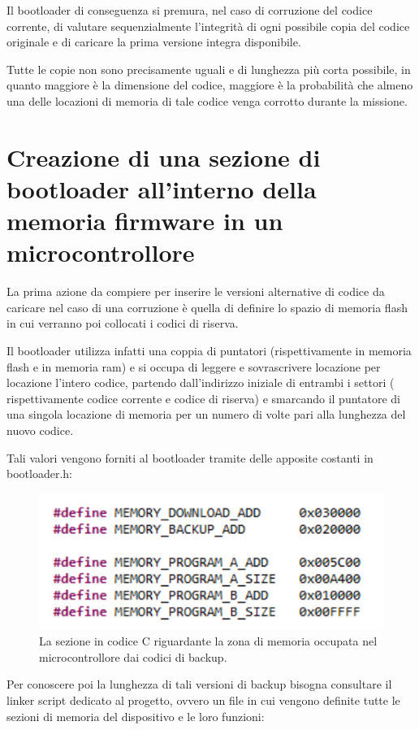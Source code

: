 \documentclass[LaM,binding=0.6cm]{../sapthesis}
\begin{document}
Il bootloader di conseguenza si premura, nel caso di corruzione del codice corrente, di valutare sequenzialmente l'integrità di ogni possibile copia del codice originale e di caricare la prima versione integra disponibile.

Tutte le copie non sono precisamente uguali e di lunghezza più corta possibile, in quanto maggiore è la dimensione del codice, maggiore è la probabilità che almeno una delle locazioni di memoria di tale codice venga corrotto durante la missione.



\section{Creazione di una sezione di bootloader all'interno della memoria firmware in un microcontrollore}

La prima azione da compiere per inserire le versioni alternative di codice da caricare nel caso di una corruzione è quella di definire lo spazio di memoria flash in cui verranno poi collocati i codici di riserva.

Il bootloader utilizza  infatti una coppia di puntatori (rispettivamente in memoria flash e in memoria ram) e si occupa di leggere e sovrascrivere locazione per locazione l'intero codice,
partendo dall'indirizzo iniziale di entrambi i settori ( rispettivamente codice corrente e codice di riserva) e smarcando il puntatore di una singola locazione di memoria per un numero di volte pari alla lunghezza del nuovo codice.\newline

Tali valori vengono forniti al bootloader tramite delle apposite costanti in bootloader.h:

\begin{figure}[htbp]
\centerline{\includegraphics[scale=.7]{examples/BackupSection.PNG}}
\caption{La sezione in codice C riguardante la zona di memoria occupata nel microcontrollore dai codici di backup.}
\label{fig}
\end{figure}
\newpage
Per conoscere poi la lunghezza di tali versioni di backup bisogna consultare il linker script dedicato al progetto, ovvero un file in cui vengono definite tutte le sezioni di memoria del dispositivo e le loro funzioni:
\end{document}
